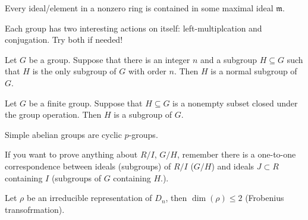 \documentclass[openany]{book}
\begin{document}
\begin{prop}
    Every ideal/element in a nonzero ring is contained in some maximal ideal $\mathfrak{m}$.
\end{prop}

\begin{prop}
    Each group has two interesting actions on itself: left-multiplcation and conjugation. Try both if needed!
\end{prop}

\begin{prop}
    Let $G$ be a group. Suppose that there is an integer $n$ and a subgroup $H\subseteq G$ such that $H$ is the only subgroup of $G$ with order $n$. Then $H$ is a normal subgroup of $G$.
\end{prop}

\begin{prop}
    Let $G$ be a finite group. Suppose that $H\subseteq G$ is a nonempty subset closed under the group operation. Then $H$ is a subgroup of $G$.
\end{prop}


\begin{prop}
    Simple abelian groups are cyclic $p$-groups.
\end{prop}

\begin{prop}
    If you want to prove anything about $R/I$, $G/H$, remember there is a one-to-one correspondence between ideals (subgroups) of $R/I$ ($G/H$) and ideals $J\subset R$ containing $I$ (subgroups of $G$ containing $H$.).
\end{prop}


\begin{prop}
    Let $\rho$ be an irreducible representation of $D_n$, then $\dim(\rho)\leq 2$ (Frobenius transofrmation).
\end{prop}
\end{document}
